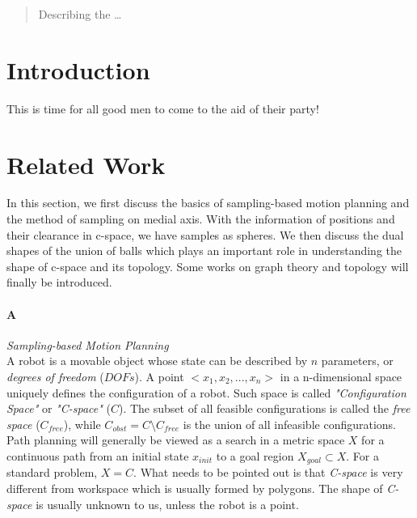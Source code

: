 \documentclass[11pt]{article}
\begin{document}
\maketitle

\begin{abstract}
Describing the  \ldots
\end{abstract}

\section{Introduction}
This is time for all good men to come to the aid of their party!

%

\section{Related Work}\label{related work}

\indent\indent In this section, we first discuss the basics of sampling-based motion planning and the method of sampling on medial axis. With the information of positions and their clearance in c-space, we have samples as spheres. We then discuss the dual shapes of the union of balls which plays an important role in understanding the shape of c-space and its topology. Some works on graph theory and topology will finally be introduced.


\paragraph{A} \emph{Sampling-based Motion Planning} \hfill \\
\indent A robot is a movable object whose state can be described by $n$ parameters, or \emph{degrees of freedom} ($DOFs$). A point $<x_1, x_2, ..., x_n>$ in a n-dimensional space uniquely defines the configuration of a robot. Such space is called \emph{"Configuration Space"} or \emph{"C-space"}  ($C$). The subset of all feasible configurations is called the \emph{free space} (\emph{$C_{free}$}), while $C_{obst} = C \setminus C_{free}$ is the union of all infeasible configurations. \cite{UMAPRM} Path planning will generally be viewed as a search in a metric space $X$ for a continuous path from an initial state $x_{init}$ to a goal region $X_{goal} \subset X$. For a standard problem, $X = C$. \cite{RRT} What needs to be pointed out is that \emph{C-space} is very different from workspace which is usually formed by polygons. The shape of \emph{C-space} is usually unknown to us, unless the robot is a point. 
\end{document}
